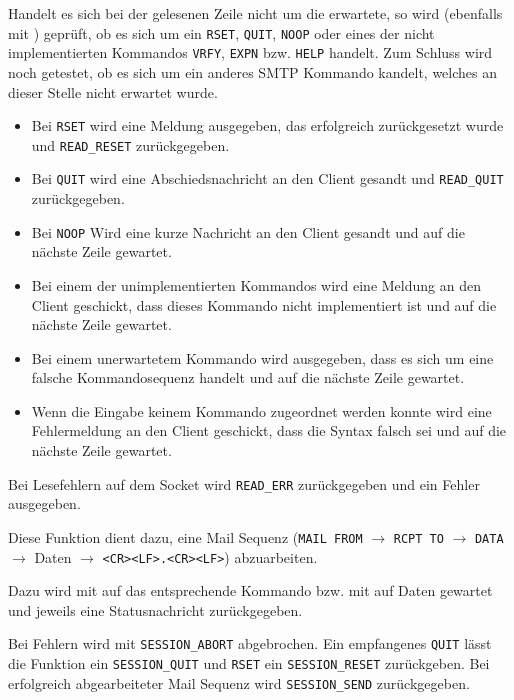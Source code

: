Handelt es sich bei der gelesenen Zeile nicht um die erwartete, so wird (ebenfalls mit ) gepr\"{u}ft, ob es sich um ein \texttt{RSET}, \texttt{QUIT}, \texttt{NOOP} oder eines der nicht implementierten Kommandos \texttt{VRFY}, \texttt{EXPN} bzw. \texttt{HELP} handelt. Zum Schluss wird noch getestet, ob es sich um ein anderes SMTP Kommando kandelt, welches an dieser Stelle nicht erwartet wurde.
\begin{itemize}
  \item Bei \texttt{RSET} wird eine Meldung ausgegeben, das erfolgreich zur\"{u}ckgesetzt wurde und \texttt{READ\_RESET} zur\"{u}ckgegeben. 
  \item Bei \texttt{QUIT} wird eine Abschiedsnachricht an den Client gesandt und \texttt{READ\_QUIT} zur\"{u}ckgegeben. 
  \item Bei \texttt{NOOP} Wird eine kurze Nachricht an den Client gesandt und auf die n\"{a}chste Zeile gewartet.
  \item Bei einem der unimplementierten Kommandos wird eine Meldung an den Client geschickt, dass dieses Kommando nicht implementiert ist und auf die n\"{a}chste Zeile gewartet.
  \item Bei einem unerwartetem Kommando wird ausgegeben, dass es sich um eine  falsche Kommandosequenz handelt und auf die n\"{a}chste Zeile gewartet.
  \item Wenn die Eingabe keinem Kommando zugeordnet werden konnte wird eine Fehlermeldung an den Client geschickt, dass die Syntax falsch sei und auf die n\"{a}chste Zeile gewartet. 
\end{itemize}

Bei Lesefehlern auf dem Socket wird \texttt{READ\_ERR} zur\"{u}ckgegeben und ein Fehler ausgegeben.


\label{fn:smtp_session_sequence}
Diese Funktion dient dazu, eine Mail Sequenz (\texttt{MAIL FROM} $\rightarrow$ \texttt{RCPT TO} $\rightarrow$ \texttt{DATA} $\rightarrow$ Daten $\rightarrow$ \texttt{<CR><LF>.<CR><LF>}) abzuarbeiten.

Dazu wird mit  auf das entsprechende Kommando bzw. mit  auf Daten gewartet und jeweils eine Statusnachricht zur\"{u}ckgegeben.

Bei Fehlern wird mit \texttt{SESSION\_ABORT} abgebrochen. Ein empfangenes \texttt{QUIT} l\"{a}sst die Funktion ein \texttt{SESSION\_QUIT} und \texttt{RSET} ein \texttt{SESSION\_RESET} zur\"{u}ckgeben. Bei erfolgreich abgearbeiteter Mail Sequenz wird \texttt{SESSION\_SEND} zur\"{u}ckgegeben.


